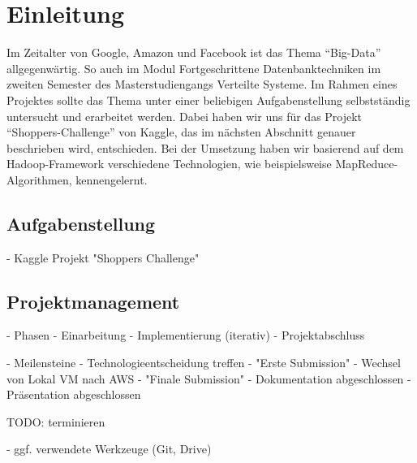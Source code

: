 \section{Einleitung}
Im Zeitalter von Google, Amazon und Facebook ist das Thema "`Big-Data"' allgegenwärtig. So auch im Modul Fortgeschrittene Datenbanktechniken im zweiten Semester des Masterstudiengangs Verteilte Systeme. Im Rahmen eines Projektes sollte das Thema unter einer beliebigen Aufgabenstellung selbstständig untersucht und erarbeitet werden. Dabei haben wir uns für das Projekt "`Shoppers-Challenge"' von Kaggle, das im nächsten Abschnitt genauer beschrieben wird, entschieden. Bei der Umsetzung haben wir basierend auf dem Hadoop-Framework verschiedene Technologien, wie beispielsweise MapReduce-Algorithmen, kennengelernt.

\subsection{Aufgabenstellung}
- Kaggle Projekt "Shoppers Challenge"

\subsection{Projektmanagement}
- Phasen
	- Einarbeitung
	- Implementierung (iterativ)
	- Projektabschluss
	
- Meilensteine
	- Technologieentscheidung treffen
	- "Erste Submission"
	- Wechsel von Lokal VM nach AWS
	- "Finale Submission" 
	- Dokumentation abgeschlossen
	- Präsentation abgeschlossen
	
	TODO: terminieren
	
- ggf. verwendete Werkzeuge (Git, Drive)





